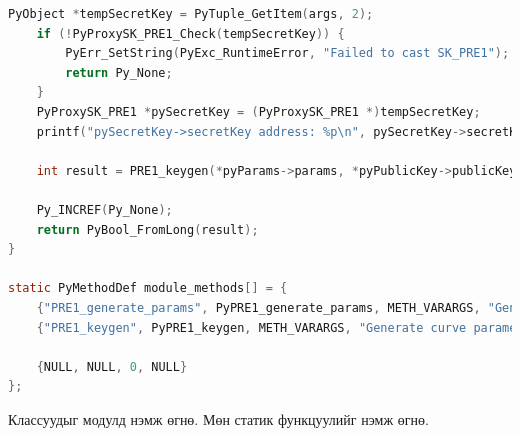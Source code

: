 \begin{lstlisting}[language=C, caption={setup.py}]
    PyObject *tempSecretKey = PyTuple_GetItem(args, 2);
    if (!PyProxySK_PRE1_Check(tempSecretKey)) {
        PyErr_SetString(PyExc_RuntimeError, "Failed to cast SK_PRE1");
        return Py_None;
    }
    PyProxySK_PRE1 *pySecretKey = (PyProxySK_PRE1 *)tempSecretKey;
    printf("pySecretKey->secretKey address: %p\n", pySecretKey->secretKey);

    int result = PRE1_keygen(*pyParams->params, *pyPublicKey->publicKey, *pySecretKey->secretKey);
    
    Py_INCREF(Py_None);
    return PyBool_FromLong(result);
}

static PyMethodDef module_methods[] = {
    {"PRE1_generate_params", PyPRE1_generate_params, METH_VARARGS, "Generate curve parameters for the PRE1 scheme."},
    {"PRE1_keygen", PyPRE1_keygen, METH_VARARGS, "Generate curve parameters for the PRE1 scheme."},

    {NULL, NULL, 0, NULL}
};
\end{lstlisting}
\noindent Классуудыг модулд нэмж өгнө. Мөн статик функцуулийг нэмж өгнө.

